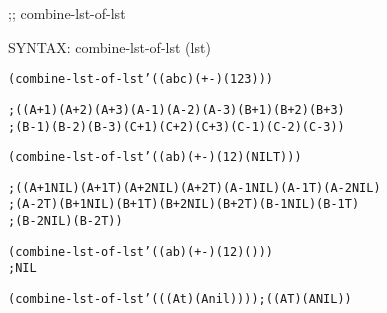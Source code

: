\begin{aibox}{\function}
;; combine-lst-of-lst

SYNTAX: combine-lst-of-lst (lst)
\end{aibox}

\begin{aibox}{\examples}
\begin{alltt}
 (combine-lst-of-lst '((a b c) (+ -) (1 2 3)))

;((A + 1) (A + 2) (A + 3) (A - 1) (A - 2) (A - 3) (B + 1) (B + 2) (B + 3)
; (B - 1) (B - 2) (B - 3) (C + 1) (C + 2) (C + 3) (C - 1) (C - 2) (C - 3))

(combine-lst-of-lst '((a b) (+ -) (1 2) (NIL T)))

; ((A + 1 NIL) (A + 1 T) (A + 2 NIL) (A + 2 T) (A - 1 NIL) (A - 1 T) (A - 2 NIL)
; (A - 2 T) (B + 1 NIL) (B + 1 T) (B + 2 NIL) (B + 2 T) (B - 1 NIL) (B - 1 T)
; (B - 2 NIL) (B - 2 T))

(combine-lst-of-lst '((a b) (+ -) (1 2) ()))
; NIL

(combine-lst-of-lst '(((A t) (A nil)))) ; ((A T) (A NIL))
\end{alltt}

\end{aibox}

